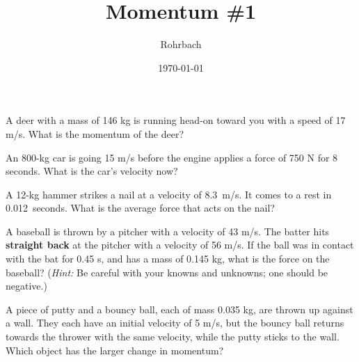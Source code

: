 \documentclass[10pt]{exam}
\title{Momentum \#1}
\author{Rohrbach}
\date{\today}
\begin{document}
\maketitle

\begin{questions}
  
  \question
    A deer with a mass of 146 kg is running head-on toward you with a speed of 17 m/s. What is the momentum of the deer?
    \vs
  
  \question
    An 800-kg car is going 15 m/s before the engine applies a force of 750 N for 8 seconds.  What is the car's velocity now?
    \vs[2]

  \question
    A 12-kg hammer strikes a nail at a velocity of 8.3~m/s.  It comes to a rest in 0.012~seconds.  What is the average force that acts on the nail?
    \vs[2]

  \pagebreak

  \question
    A baseball is thrown by a pitcher with a velocity of 43 m/s. The batter hits {\bf straight back} at the pitcher with a velocity of 56 m/s. If the ball was in contact with the bat for 0.45 s, and has a mass of 0.145 kg, what is the force on the baseball? (\emph{Hint:} Be careful with your knowns and unknowns; one should be negative.)
    \vs
  
  \question
    A piece of putty and a bouncy ball, each of mass 0.035 kg, are thrown up against a wall. They each have an initial velocity of 5 m/s, but the bouncy ball returns towards the thrower with the same velocity, while the putty sticks to the wall. Which object has the larger change in momentum?

    \begin{center}
\end{center}
\end{questions}
\end{document}
